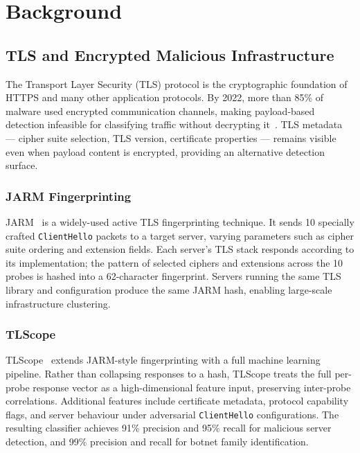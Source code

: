 \documentclass[12pt, a4paper, twoside]{report}
\begin{document}
\chapter{Background}
\label{ch:background}

\section{TLS and Encrypted Malicious Infrastructure}

The Transport Layer Security (TLS) protocol is the cryptographic foundation of HTTPS and many
other application protocols. By 2022, more than 85\% of malware used encrypted communication
channels, making payload-based detection infeasible for classifying traffic without decrypting
it~\cite{theofanous2024tlscope}. TLS metadata --- cipher suite selection, TLS version, certificate
properties --- remains visible even when payload content is encrypted, providing an alternative
detection surface.

\subsection{JARM Fingerprinting}

JARM~\cite{jarm2020} is a widely-used active TLS fingerprinting technique. It sends 10 specially
crafted \texttt{ClientHello} packets to a target server, varying parameters such as cipher suite
ordering and extension fields. Each server's TLS stack responds according to its implementation;
the pattern of selected ciphers and extensions across the 10 probes is hashed into a 62-character
fingerprint. Servers running the same TLS library and configuration produce the same JARM hash,
enabling large-scale infrastructure clustering.

\subsection{TLScope}

TLScope~\cite{theofanous2024tlscope} extends JARM-style fingerprinting with a full machine
learning pipeline. Rather than collapsing responses to a hash, TLScope treats the full per-probe
response vector as a high-dimensional feature input, preserving inter-probe correlations.
Additional features include certificate metadata, protocol capability flags, and server
behaviour under adversarial \texttt{ClientHello} configurations. The resulting classifier
achieves 91\% precision and 95\% recall for malicious server detection, and 99\% precision and
recall for botnet family identification.
\end{document}
